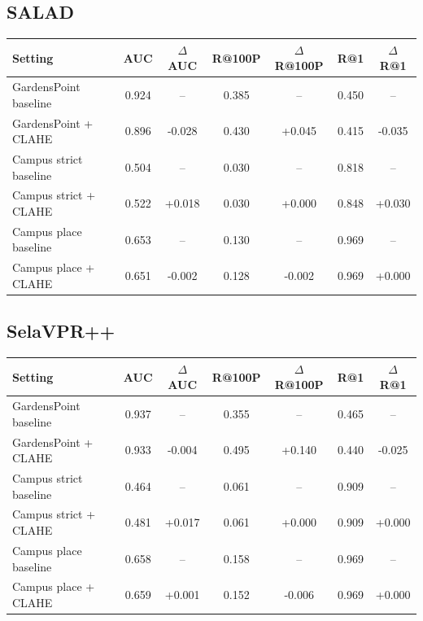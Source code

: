 \documentclass[11pt]{article}
\begin{document}
\subsection*{SALAD}
\begin{center}
\begin{tabular}{>{\raggedright\arraybackslash}p{3.0cm}cccccc}
\toprule
\textbf{Setting} & \textbf{AUC} & \textbf{$\Delta$AUC} & \textbf{R@100P} & \textbf{$\Delta$R@100P} & \textbf{R@1} & \textbf{$\Delta$R@1} \\
\midrule
GardensPoint baseline & 0.924 & -- & 0.385 & -- & 0.450 & -- \\
GardensPoint + CLAHE & 0.896 & -0.028 & 0.430 & +0.045 & 0.415 & -0.035 \\
\midrule
Campus strict baseline & 0.504 & -- & 0.030 & -- & 0.818 & -- \\
Campus strict + CLAHE & 0.522 & +0.018 & 0.030 & +0.000 & 0.848 & +0.030 \\
\midrule
Campus place baseline & 0.653 & -- & 0.130 & -- & 0.969 & -- \\
Campus place + CLAHE & 0.651 & -0.002 & 0.128 & -0.002 & 0.969 & +0.000 \\
\bottomrule
\end{tabular}
\end{center}

\subsection*{SelaVPR++}
\begin{center}
\begin{tabular}{>{\raggedright\arraybackslash}p{3.0cm}cccccc}
\toprule
\textbf{Setting} & \textbf{AUC} & \textbf{$\Delta$AUC} & \textbf{R@100P} & \textbf{$\Delta$R@100P} & \textbf{R@1} & \textbf{$\Delta$R@1} \\
\midrule
GardensPoint baseline & 0.937 & -- & 0.355 & -- & 0.465 & -- \\
GardensPoint + CLAHE & 0.933 & -0.004 & 0.495 & +0.140 & 0.440 & -0.025 \\
\midrule
Campus strict baseline & 0.464 & -- & 0.061 & -- & 0.909 & -- \\
Campus strict + CLAHE & 0.481 & +0.017 & 0.061 & +0.000 & 0.909 & +0.000 \\
\midrule
Campus place baseline & 0.658 & -- & 0.158 & -- & 0.969 & -- \\
Campus place + CLAHE & 0.659 & +0.001 & 0.152 & -0.006 & 0.969 & +0.000 \\
\bottomrule
\end{tabular}
\end{center}
\end{document}
